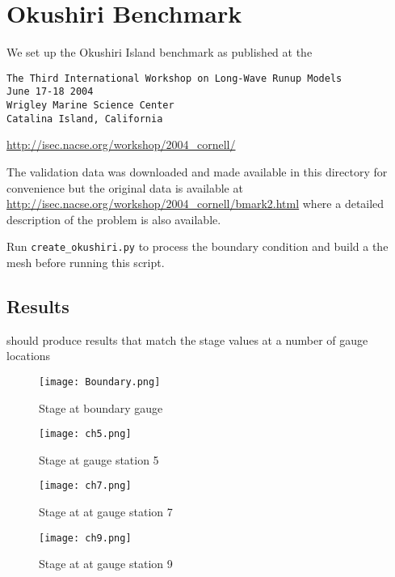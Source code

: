 
\section{Okushiri Benchmark}

We set up the Okushiri Island benchmark as published at the
\begin{verbatim}
The Third International Workshop on Long-Wave Runup Models
June 17-18 2004
Wrigley Marine Science Center
Catalina Island, California
\end{verbatim}
\url{http://isec.nacse.org/workshop/2004_cornell/}


The validation data was downloaded and made available in this directory
for convenience but the original data is available at
\url{http://isec.nacse.org/workshop/2004_cornell/bmark2.html}
where a detailed description of the problem is also available.


Run \verb|create_okushiri.py| to process the boundary condition and build a the
mesh before running this script.

\subsection{Results}

\anuga{} should produce results that match the stage values at a number of gauge locations



\begin{figure}[h]
\begin{center}
\texttt{[image: Boundary.png]}
\end{center}
\caption{Stage at boundary gauge}
\label{okushiri:boundary}
\end{figure}



\begin{figure}[h]
\begin{center}
\texttt{[image: ch5.png]}
\end{center}
\caption{Stage at gauge station 5}
\label{okushiri:ch:five}
\end{figure}

\begin{figure}[h]
\begin{center}
\texttt{[image: ch7.png]}
\end{center}
\caption{Stage at at gauge station 7}
\label{okushiri:ch_seven}
\end{figure}

\begin{figure}[h]
\begin{center}
\texttt{[image: ch9.png]}
\end{center}
\caption{Stage at at gauge station 9}
\label{okushiri:ch_nine}
\end{figure}




\endinput